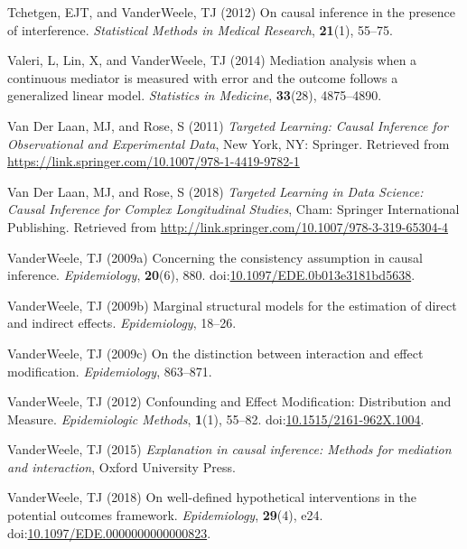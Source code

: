 \documentclass[
  singlecolumn]{article}
\newlength{\cslhangindent}
\newenvironment{CSLReferences}[2] %
 {\begin{list}{}{%
  \setlength{\itemindent}{0pt}
  \setlength{\leftmargin}{0pt}
  \setlength{\parsep}{0pt}
  \ifodd #1
   \setlength{\leftmargin}{\cslhangindent}
   \setlength{\itemindent}{-1\cslhangindent}
  \fi
  \setlength{\itemsep}{#2\baselineskip}}}
 {\end{list}}
\begin{document}
\begin{CSLReferences}{1}{0}
Tchetgen, EJT, and VanderWeele, TJ (2012) On causal inference in the
presence of interference. \emph{Statistical Methods in Medical
Research}, \textbf{21}(1), 55--75.

Valeri, L, Lin, X, and VanderWeele, TJ (2014) Mediation analysis when a
continuous mediator is measured with error and the outcome follows a
generalized linear model. \emph{Statistics in Medicine},
\textbf{33}(28), 4875--4890.

Van Der Laan, MJ, and Rose, S (2011) \emph{Targeted Learning: Causal
Inference for Observational and Experimental Data}, New York, NY:
Springer. Retrieved from
\url{https://link.springer.com/10.1007/978-1-4419-9782-1}

Van Der Laan, MJ, and Rose, S (2018) \emph{Targeted Learning in Data
Science: Causal Inference for Complex Longitudinal Studies}, Cham:
Springer International Publishing. Retrieved from
\url{http://link.springer.com/10.1007/978-3-319-65304-4}

VanderWeele, TJ (2009a) Concerning the consistency assumption in causal
inference. \emph{Epidemiology}, \textbf{20}(6), 880.
doi:\href{https://doi.org/10.1097/EDE.0b013e3181bd5638}{10.1097/EDE.0b013e3181bd5638}.

VanderWeele, TJ (2009b) Marginal structural models for the estimation of
direct and indirect effects. \emph{Epidemiology}, 18--26.

VanderWeele, TJ (2009c) On the distinction between interaction and
effect modification. \emph{Epidemiology}, 863--871.

VanderWeele, TJ (2012) Confounding and Effect Modification: Distribution
and Measure. \emph{Epidemiologic Methods}, \textbf{1}(1), 55--82.
doi:\href{https://doi.org/10.1515/2161-962X.1004}{10.1515/2161-962X.1004}.

VanderWeele, TJ (2015) \emph{Explanation in causal inference: Methods
for mediation and interaction}, Oxford University Press.

VanderWeele, TJ (2018) On well-defined hypothetical interventions in the
potential outcomes framework. \emph{Epidemiology}, \textbf{29}(4), e24.
doi:\href{https://doi.org/10.1097/EDE.0000000000000823}{10.1097/EDE.0000000000000823}.


\end{CSLReferences}
\end{document}
